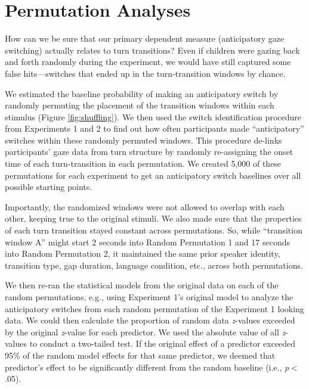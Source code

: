 \documentclass[authoryear, 12pt]{elsarticle}
\begin{document}


\clearpage

\appendix

\section{Permutation Analyses}
\label{sec:permutation}
\setcounter{figure}{0}
\setcounter{table}{0}  
How can we be sure that our primary dependent measure (anticipatory gaze switching) actually relates to turn transitions? Even if children were gazing back and forth randomly during the experiment, we would have still captured some false hits---switches that ended up in the turn-transition windows by chance.

We estimated the baseline probability of making an anticipatory switch by randomly permuting the placement of the transition windows within each stimulus (Figure \ref{fig:shuffling}). We then used the switch identification procedure from Experiments 1 and 2 to find out how often participants made ``anticipatory'' switches within these randomly permuted windows. This procedure de-links participants' gaze data from turn structure by randomly re-assigning the onset time of each turn-transition in each permutation. We created 5,000 of these permutations for each experiment to get an anticipatory switch baselines over all possible starting points.

Importantly, the randomized windows were not allowed to overlap with each other, keeping true to the original stimuli. We also made sure that the properties of each turn transition stayed constant across permutations. So, while ``transition window A'' might start 2 seconds into Random Permutation 1 and 17 seconds into Random Permutation 2, it maintained the same prior speaker identity, transition type, gap duration, language condition, etc., across both permutations.

We then re-ran the statistical models from the original data on each of the random permutations, e.g., using Experiment 1's original model to analyze the anticipatory switches from each random permutation of the Experiment 1 looking data. We could then calculate the proportion of random data \textit{z}-values exceeded by the original \textit{z}-value for each predictor. We used the absolute value of all \textit{z}-values to conduct a two-tailed test. If the original effect of a predictor exceeded 95\% of the random model effects for that same predictor, we deemed that predictor's effect to be significantly different from the random baseline (i.e., \textit{p}$<$.05).
\end{document}

